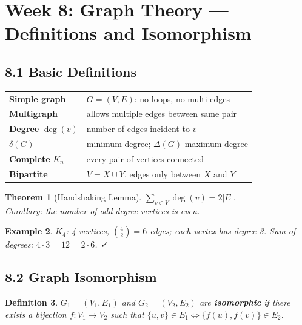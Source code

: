 \documentclass[11pt]{article}
\newtheorem{definition}{Definition}[section]
\newtheorem{example}[definition]{Example}
\newtheorem{theorem}[definition]{Theorem}
\begin{document}
\newpage
\section{Week 8: Graph Theory — Definitions and Isomorphism}
\setcounter{definition}{0}

\subsection*{8.1 Basic Definitions}

\begin{tcolorbox}[keybox={Graph vocabulary}]
\begin{tabular}{@{}ll@{}}
\textbf{Simple graph} & $G=(V,E)$: no loops, no multi-edges\\
\textbf{Multigraph}   & allows multiple edges between same pair\\
\textbf{Degree} $\deg(v)$ & number of edges incident to $v$\\
$\delta(G)$           & minimum degree; $\Delta(G)$ maximum degree\\
\textbf{Complete} $K_n$ & every pair of vertices connected\\
\textbf{Bipartite}    & $V=X\cup Y$, edges only between $X$ and $Y$\\
\end{tabular}
\end{tcolorbox}

\begin{theorem}[Handshaking Lemma]
$\displaystyle\sum_{v\in V}\deg(v)=2|E|$. \\
Corollary: the number of odd-degree vertices is even.
\end{theorem}

\begin{example}
$K_4$: 4 vertices, $\binom{4}{2}=6$ edges; each vertex has degree 3. Sum of degrees: $4\cdot3=12=2\cdot6$. ✓
\end{example}

\subsection*{8.2 Graph Isomorphism}

\begin{definition}
$G_1=(V_1,E_1)$ and $G_2=(V_2,E_2)$ are \textbf{isomorphic} if there exists a bijection $f:V_1\to V_2$ such that $\{u,v\}\in E_1\Leftrightarrow\{f(u),f(v)\}\in E_2$.
\end{definition}
\end{document}
